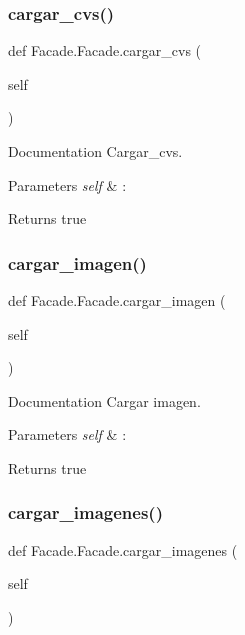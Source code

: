 \subsubsection{\texorpdfstring{cargar\+\_\+cvs()}{cargar\_cvs()}}
{\footnotesize\ttfamily def Facade.\+Facade.\+cargar\+\_\+cvs (\begin{DoxyParamCaption}\item[{}]{self }\end{DoxyParamCaption})}



Documentation Cargar\+\_\+cvs. 


\begin{DoxyParams}{Parameters}
{\em self} & \+: \\
\hline
\end{DoxyParams}
\begin{DoxyReturn}{Returns}
true 
\end{DoxyReturn}
\mbox{\label{class_facade_1_1_facade_a04ad2739895ce3afb592870e79e90d1d}} 
\subsubsection{\texorpdfstring{cargar\+\_\+imagen()}{cargar\_imagen()}}
{\footnotesize\ttfamily def Facade.\+Facade.\+cargar\+\_\+imagen (\begin{DoxyParamCaption}\item[{}]{self }\end{DoxyParamCaption})}



Documentation Cargar imagen. 


\begin{DoxyParams}{Parameters}
{\em self} & \+: \\
\hline
\end{DoxyParams}
\begin{DoxyReturn}{Returns}
true 
\end{DoxyReturn}
\mbox{\label{class_facade_1_1_facade_a04f3d8f489b9054d4d40ac2a60c1881e}} 
\subsubsection{\texorpdfstring{cargar\+\_\+imagenes()}{cargar\_imagenes()}}
{\footnotesize\ttfamily def Facade.\+Facade.\+cargar\+\_\+imagenes (\begin{DoxyParamCaption}\item[{}]{self }\end{DoxyParamCaption})}



